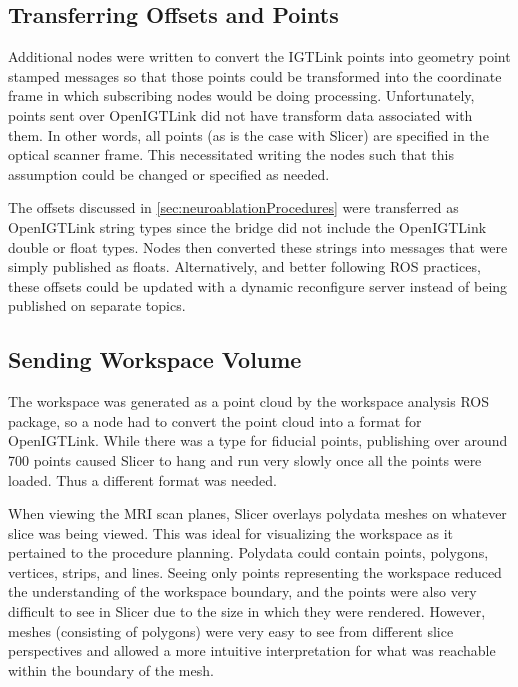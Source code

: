 \documentclass[12pt]{report}
\begin{document}
\subsection{Transferring Offsets and Points}
Additional nodes were written to convert the IGTLink points into geometry point stamped messages so that those points could be transformed into the coordinate frame in which subscribing nodes would be doing processing. Unfortunately, points sent over OpenIGTLink did not have transform data associated with them. In other words, all points (as is the case with Slicer) are specified in the optical scanner frame. This necessitated writing the nodes such that this assumption could be changed or specified as needed.

The offsets discussed in \autoref{sec:neuroablationProcedures} were transferred as OpenIGTLink string types since the bridge did not include the OpenIGTLink double or float types. Nodes then converted these strings into messages that were simply published as floats. Alternatively, and better following ROS practices, these offsets could be updated with a dynamic reconfigure server instead of being published on separate topics.

\subsection{Sending Workspace Volume}
\label{sec:sendingWorkspaceVolume}
The workspace was generated as a point cloud by the workspace analysis ROS package, so a node had to convert the point cloud into a format for OpenIGTLink. While there was a type for fiducial points, publishing over around 700 points caused Slicer to hang and run very slowly once all the points were loaded. Thus a different format was needed.

When viewing the MRI scan planes, Slicer overlays polydata meshes on whatever slice was being viewed. This was ideal for visualizing the workspace as it pertained to the procedure planning. Polydata could contain points, polygons, vertices, strips, and lines. Seeing only points representing the workspace reduced the understanding of the workspace boundary, and the points were also very difficult to see in Slicer due to the size in which they were rendered. However, meshes (consisting of polygons) were very easy to see from different slice perspectives and allowed a more intuitive interpretation for what was reachable within the boundary of the mesh.
\end{document}

